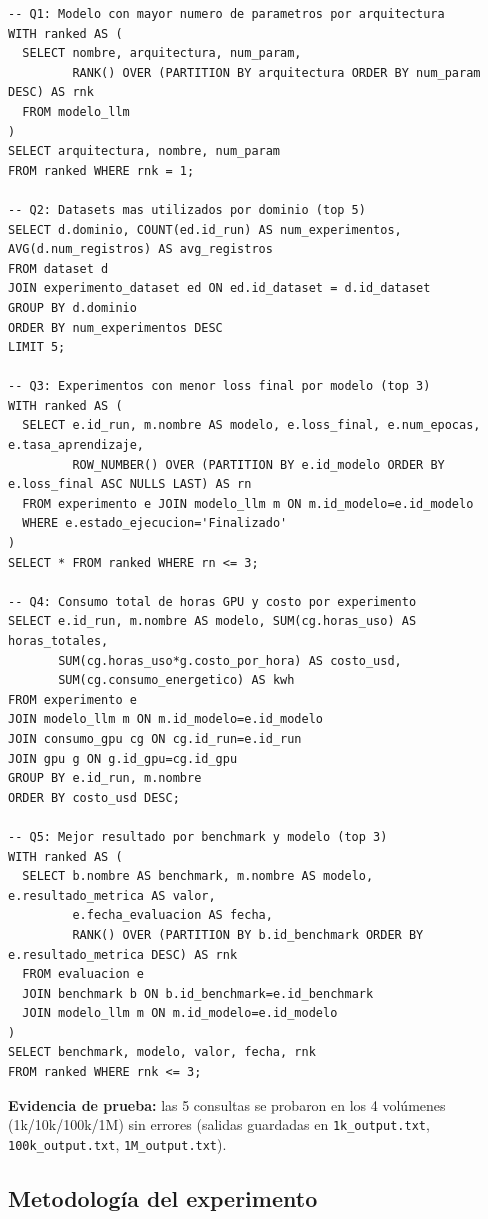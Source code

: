 \documentclass[12pt,a4paper]{article}
\begin{document}
\begin{lstlisting}
-- Q1: Modelo con mayor numero de parametros por arquitectura
WITH ranked AS (
  SELECT nombre, arquitectura, num_param,
         RANK() OVER (PARTITION BY arquitectura ORDER BY num_param DESC) AS rnk
  FROM modelo_llm
)
SELECT arquitectura, nombre, num_param
FROM ranked WHERE rnk = 1;

-- Q2: Datasets mas utilizados por dominio (top 5)
SELECT d.dominio, COUNT(ed.id_run) AS num_experimentos, AVG(d.num_registros) AS avg_registros
FROM dataset d
JOIN experimento_dataset ed ON ed.id_dataset = d.id_dataset
GROUP BY d.dominio
ORDER BY num_experimentos DESC
LIMIT 5;

-- Q3: Experimentos con menor loss final por modelo (top 3)
WITH ranked AS (
  SELECT e.id_run, m.nombre AS modelo, e.loss_final, e.num_epocas, e.tasa_aprendizaje,
         ROW_NUMBER() OVER (PARTITION BY e.id_modelo ORDER BY e.loss_final ASC NULLS LAST) AS rn
  FROM experimento e JOIN modelo_llm m ON m.id_modelo=e.id_modelo
  WHERE e.estado_ejecucion='Finalizado'
)
SELECT * FROM ranked WHERE rn <= 3;

-- Q4: Consumo total de horas GPU y costo por experimento
SELECT e.id_run, m.nombre AS modelo, SUM(cg.horas_uso) AS horas_totales,
       SUM(cg.horas_uso*g.costo_por_hora) AS costo_usd,
       SUM(cg.consumo_energetico) AS kwh
FROM experimento e
JOIN modelo_llm m ON m.id_modelo=e.id_modelo
JOIN consumo_gpu cg ON cg.id_run=e.id_run
JOIN gpu g ON g.id_gpu=cg.id_gpu
GROUP BY e.id_run, m.nombre
ORDER BY costo_usd DESC;

-- Q5: Mejor resultado por benchmark y modelo (top 3)
WITH ranked AS (
  SELECT b.nombre AS benchmark, m.nombre AS modelo, e.resultado_metrica AS valor,
         e.fecha_evaluacion AS fecha,
         RANK() OVER (PARTITION BY b.id_benchmark ORDER BY e.resultado_metrica DESC) AS rnk
  FROM evaluacion e
  JOIN benchmark b ON b.id_benchmark=e.id_benchmark
  JOIN modelo_llm m ON m.id_modelo=e.id_modelo
)
SELECT benchmark, modelo, valor, fecha, rnk
FROM ranked WHERE rnk <= 3;
\end{lstlisting}

\textbf{Evidencia de prueba:} las 5 consultas se probaron en los 4 volúmenes (1k/10k/100k/1M) sin errores (salidas guardadas en \texttt{1k\_output.txt}, \texttt{100k\_output.txt}, \texttt{1M\_output.txt}).

\subsection{Metodología del experimento}
\end{document}
